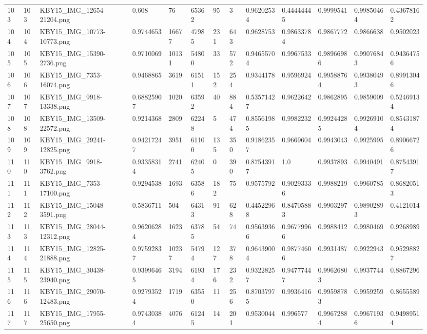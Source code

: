 \documentclass[11pt, a4paper, twoside]{report}
\begin{document}
\begin{longtable}[c]{@{}lllllllllllll@{}}
103 & 103 & KBY15\_IMG\_12654-21204.png & 0.608 & 76 & 65362 & 95 & 3 & 0.96202534 & 0.44444445 & 0.9999541 & 0.99850464 & 0.43678162 \\
104 & 104 & KBY15\_IMG\_10773-10773.png & 0.9744653 & 16677 & 47985 & 231 & 643 & 0.9628753 & 0.98633784 & 0.9867772 & 0.9866638 & 0.9502023 \\
105 & 105 & KBY15\_IMG\_15390-2736.png & 0.9710069 & 10131 & 54800 & 33 & 572 & 0.94655704 & 0.9967533 & 0.98966986 & 0.99076843 & 0.94364756 \\
106 & 106 & KBY15\_IMG\_7353-16074.png & 0.9468865 & 3619 & 61511 & 152 & 254 & 0.9344178 & 0.9596924 & 0.99588764 & 0.99380493 & 0.89913046 \\
107 & 107 & KBY15\_IMG\_9918-13338.png & 0.68825907 & 1020 & 63592 & 40 & 884 & 0.53571427 & 0.9622642 & 0.9862895 & 0.9859009 & 0.52469134 \\
108 & 108 & KBY15\_IMG\_13509-22572.png & 0.9214368 & 2809 & 62248 & 5 & 474 & 0.85561985 & 0.9982232 & 0.99244285 & 0.99269104 & 0.85431874 \\
109 & 109 & KBY15\_IMG\_29241-12825.png & 0.94217247 & 3951 & 61100 & 135 & 350 & 0.91862357 & 0.9669604 & 0.9943043 & 0.9925995 & 0.89066726 \\
110 & 110 & KBY15\_IMG\_9918-3762.png & 0.93358314 & 2741 & 62405 & 0 & 390 & 0.87543917 & 1.0 & 0.9937893 & 0.9940491 & 0.87543917 \\
111 & 111 & KBY15\_IMG\_7353-17100.png & 0.9294538 & 1693 & 63586 & 182 & 75 & 0.9575792 & 0.90293336 & 0.9988219 & 0.9960785 & 0.86820513 \\
112 & 112 & KBY15\_IMG\_15048-3591.png & 0.5836711 & 504 & 64313 & 91 & 628 & 0.44522968 & 0.84705883 & 0.9903297 & 0.98902893 & 0.4121014 \\
113 & 113 & KBY15\_IMG\_28044-12312.png & 0.96206284 & 1623 & 63785 & 54 & 74 & 0.95639366 & 0.96779966 & 0.9988412 & 0.9980469 & 0.9268989 \\
114 & 114 & KBY15\_IMG\_12825-21888.png & 0.97592837 & 10237 & 54794 & 127 & 378 & 0.96439004 & 0.98774606 & 0.9931487 & 0.9922943 & 0.95298827 \\
115 & 115 & KBY15\_IMG\_30438-23940.png & 0.93996465 & 3194 & 61934 & 176 & 232 & 0.93228257 & 0.94777447 & 0.99626803 & 0.9937744 & 0.8867296 \\
116 & 116 & KBY15\_IMG\_29070-12483.png & 0.92793524 & 1719 & 63550 & 11 & 256 & 0.87037975 & 0.9936416 & 0.99598783 & 0.9959259 & 0.8655589 \\
117 & 117 & KBY15\_IMG\_17955-25650.png & 0.97430384 & 4076 & 61245 & 14 & 201 & 0.9530044 & 0.996577 & 0.99672884 & 0.99671936 & 0.94989514 \\

\end{longtable}
\end{document}
